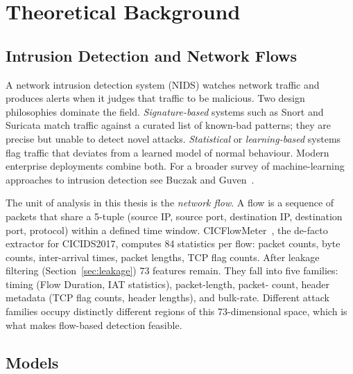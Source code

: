 \chapter{Theoretical Background}
\label{ch:background}

\section{Intrusion Detection and Network Flows}

A network intrusion detection system (NIDS) watches network traffic and
produces alerts when it judges that traffic to be malicious. Two design
philosophies dominate the field. \textit{Signature-based} systems such as
Snort and Suricata match traffic against a curated list of known-bad
patterns; they are precise but unable to detect novel attacks.
\textit{Statistical} or \textit{learning-based} systems flag traffic that
deviates from a learned model of normal behaviour. Modern enterprise
deployments combine both. For a broader survey of machine-learning
approaches to intrusion detection see Buczak and Guven~\cite{Buczak2016}.

The unit of analysis in this thesis is the \textit{network flow}. A flow
is a sequence of packets that share a 5-tuple (source IP, source port,
destination IP, destination port, protocol) within a defined time window.
CICFlowMeter~\cite{Lashkari2017}, the de-facto extractor for CICIDS2017,
computes 84 statistics per flow: packet counts, byte counts, inter-arrival
times, packet lengths, TCP flag counts. After leakage filtering
(Section~\ref{sec:leakage}) 73 features remain. They fall into five
families: timing (Flow Duration, IAT statistics), packet-length, packet-
count, header metadata (TCP flag counts, header lengths), and bulk-rate.
Different attack families occupy distinctly different regions of this
73-dimensional space, which is what makes flow-based detection feasible.


\section{Models}

